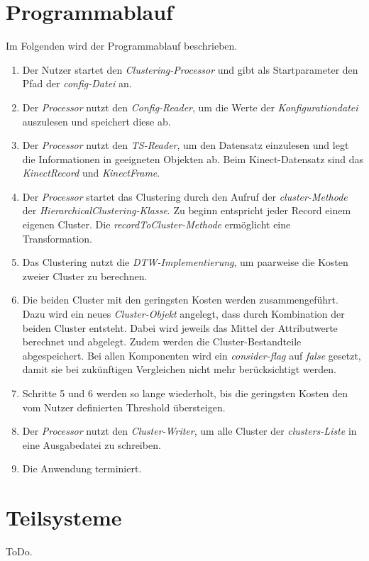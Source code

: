 \section{Programmablauf}
\label{4-Programmablauf}
Im Folgenden wird der Programmablauf beschrieben.
\begin{enumerate}
    \item Der Nutzer startet den \emph{Clustering-Processor}
    und gibt als Startparameter den Pfad der \emph{config-Datei} an.
    \item Der \emph{Processor} nutzt den \emph{Config-Reader}, um die Werte der \emph{Konfigurationdatei} auszulesen
    und speichert diese ab.
    \item Der \emph{Processor} nutzt den \emph{TS-Reader}, um den Datensatz einzulesen
    und legt die Informationen in geeigneten Objekten ab.
    Beim Kinect-Datensatz sind das \emph{KinectRecord} und \emph{KinectFrame}.
    \item Der \emph{Processor} startet das Clustering durch den Aufruf der \emph{cluster-Methode}
    der \emph{HierarchicalClustering-Klasse}.
    Zu beginn entspricht jeder Record einem eigenen Cluster.
    Die \emph{recordToCluster-Methode} ermöglicht eine Transformation.
    \item Das Clustering nutzt die \emph{\ac{DTW}-Implementierung},
    um paarweise die Kosten zweier Cluster zu berechnen.
    \item Die beiden Cluster mit den geringsten Kosten werden zusammengeführt.
    Dazu wird ein neues \emph{Cluster-Objekt} angelegt, dass durch Kombination der beiden Cluster entsteht.
    Dabei wird jeweils das Mittel der Attributwerte berechnet und abgelegt.
    Zudem werden die Cluster-Bestandteile abgespeichert.
    Bei allen Komponenten wird ein \emph{consider-flag} auf \emph{false} gesetzt,
    damit sie bei zukünftigen Vergleichen nicht mehr berücksichtigt werden.
    \item Schritte 5 und 6 werden so lange wiederholt, bis die geringsten Kosten den vom Nutzer definierten Threshold übersteigen.
    \item Der \emph{Processor} nutzt den \emph{Cluster-Writer}, um alle Cluster der \emph{clusters-Liste}
    in eine Ausgabedatei zu schreiben.
    \item Die Anwendung terminiert. 

\end{enumerate}


\section{Teilsysteme}
\label{4-Teilsysteme}
ToDo.

